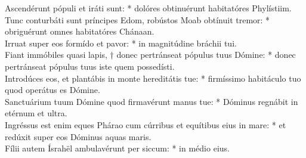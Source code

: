 {	Ascendérunt pópuli et iráti sunt: * dolóres obtinuérunt habitatóres Phylístiim. \\
	Tunc conturbáti sunt príncipes Edom, robústos Moab obtínuit tremor: * obriguérunt omnes habitatóres Chánaan. \\
	Irruat super eos formído et pavor: * in magnitúdine bráchii tui. \\
	Fiant immóbiles quasi lapis, † donec pertránseat pópulus tuus Dómine: * donec pertránseat pópulus tuus iste quem possedísti. \\
	Introdúces eos, et plantábis in monte hereditátis tue: * firmíssimo habitáculo tuo quod operátus es Dómine. \\
	Sanctuárium tuum Dómine quod firmavérunt manus tue: * Dóminus regnábit in etérnum et ultra. \\
	Ingréssus est enim eques Phárao cum cúrribus et equítibus eius in mare: * et redúxit super eos Dóminus aquas maris. \\
	Fílii autem Ísrahël ambulavérunt per siccum: * in médio eius.
}

